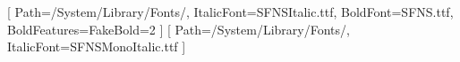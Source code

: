 \usepackage{fontspec}
\usepackage{pdflscape}
\usepackage{booktabs}
\usepackage{geometry}
\usepackage{xcolor}

\geometry{a4paper, landscape, margin=2cm}


\setmainfont{SFNS.ttf}[
  Path=/System/Library/Fonts/,
  ItalicFont=SFNSItalic.ttf,
  BoldFont=SFNS.ttf,
  BoldFeatures={FakeBold=2}
]
\setmonofont{SFNSMono.ttf}[
  Path=/System/Library/Fonts/,
  ItalicFont=SFNSMonoItalic.ttf
]


\makeatletter

\renewcommand\section{%
  \@startsection{section}{1}{\z@}%
    {-22pt \@plus -4pt \@minus -2pt}%
    {8pt \@plus 2pt}%
    {\color{headingdark}\Large\bfseries\sectionrule}}

\newcommand{\sectionrule}[1]{%
  #1\par\nobreak
  \vspace{2pt}%
  {\color{rulegrey}\hrule height 0.7pt}%
  \vspace{4pt}%
}

\renewcommand\subsection{%
  \@startsection{subsection}{2}{\z@}%
    {-14pt \@plus -3pt \@minus -2pt}%
    {5pt \@plus 1pt}%
    {\color{headingmid}\large\bfseries}}

\renewcommand\subsubsection{%
  \@startsection{subsubsection}{3}{\z@}%
    {-10pt \@plus -2pt \@minus -1pt}%
    {3pt \@plus 1pt}%
    {\color{headingdark}\normalsize\bfseries}}

\makeatother
